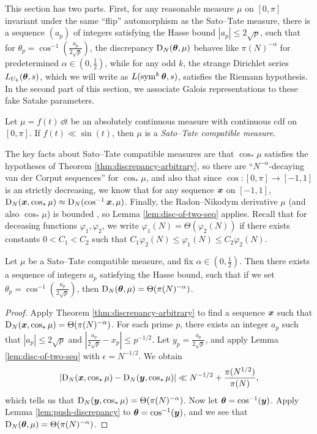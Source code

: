This section has two parts. First, for any reasonable measure $\mu$ on 
$[0,\pi]$ invariant under the same ``flip'' automorphism as the Sato--Tate 
measure, there is a sequence $(a_p)$ of integers satisfying the Hasse 
bound $|a_p|\leqslant 2\sqrt p$, such that for 
$\theta_p = \cos^{-1}\left(\frac{a_p}{2\sqrt p}\right)$, the discrepancy 
$\operatorname{D}_N({\boldsymbol\theta},\mu)$ behaves like $\pi(N)^{-\alpha}$ for predetermined 
$\alpha\in \left(0,\frac 1 2\right)$, while for any odd $k$, the strange 
Dirichlet series $L_{U_k}({\boldsymbol\theta},s)$, which we will write as 
$L(\operatorname{sym}^k {\boldsymbol\theta},s)$, satisfies the Riemann hypothesis. In the second part of 
this section, we associate Galois representations to these fake Satake 
parameters. 

\begin{definition}
Let $\mu = f(t)\, \dd t$ be an absolutely continuous measure with continuous 
cdf on $[0,\pi]$. If $f(t) \ll \sin(t)$, then $\mu$ is a \emph{Sato--Tate compatible measure}. 
\end{definition}

The key facts about Sato--Tate compatible measures are that $\cos_\ast\mu$ 
satisfies the hypotheses of Theorem \ref{thm:discrepancy-arbitrary}, so 
there are ``$N^{-\alpha}$-decaying van der Corput sequences'' for 
$\cos_\ast\mu$, and also that since $\cos\colon [0,\pi] \to [-1,1]$ is an 
strictly decreasing, we know that for any sequence ${\boldsymbol x}$ on $[-1,1]$, 
$\operatorname{D}_N({\boldsymbol x},\cos_\ast\mu) \approx \operatorname{D}_N(\cos^{-1}{\boldsymbol x},\mu)$. Finally, the 
Radon--Nikodym derivative $\mu$ (and also $\cos_\ast\mu$) is bounded , so Lemma 
\ref{lem:disc-of-two-seq} applies. Recall that for deceasing functions 
$\varphi_1,\varphi_2$, we write $\varphi_1(N) = \Theta(\varphi_2(N))$ if 
there exists constants $0 < C_1 < C_2$ such that 
$C_1 \varphi_2(N) \leqslant \varphi_1(N) \leqslant C_2 \varphi_2(N)$. 


\begin{theorem}\label{thm:integral-a_p-alpha}
Let $\mu$ be a Sato--Tate compatible measure, and fix 
$\alpha\in \left(0,\frac 1 2\right)$. 
Then there exists a sequence of integers $a_p$ satisfying the Hasse bound, 
such that if we set $\theta_p = \cos^{-1}\left(\frac{a_p}{2\sqrt p}\right)$, 
then $\operatorname{D}_N({\boldsymbol\theta},\mu) = \Theta(\pi(N)^{-\alpha})$. 
\end{theorem}
\begin{proof}
Apply Theorem \ref{thm:discrepancy-arbitrary} to find a sequence ${\boldsymbol x}$ such 
that $\operatorname{D}_N({\boldsymbol x},\cos_\ast \mu) = \Theta(\pi(N)^{-\alpha})$. For each prime 
$p$, there exists an integer $a_p$ such that $|a_p|\leqslant 2\sqrt p$ and 
$\left| \frac{a_p}{2\sqrt p} - x_p\right| \leqslant p^{-1/2}$. Let 
$y_p = \frac{a_p}{2\sqrt p}$, and apply Lemma \ref{lem:disc-of-two-seq} with 
$\epsilon = N^{-1/2}$. We obtain 
\[
	\left| \operatorname{D}_N({\boldsymbol x},\cos_\ast \mu) - \operatorname{D}_N({\boldsymbol y}, \cos_\ast \mu)\right| \ll  N^{-1/2} + \frac{\pi(N^{1/2})}{\pi(N)} ,
\]
which tells us that $\operatorname{D}_N({\boldsymbol y},\cos_\ast\mu) = \Theta(\pi(N)^{-\alpha})$. 
Now let ${\boldsymbol\theta} = \cos^{-1}({\boldsymbol y})$. Apply Lemma \ref{lem:push-discrepancy} to 
${\boldsymbol\theta} = \cos^{-1}({\boldsymbol y})$, and we see that 
$\operatorname{D}_N({\boldsymbol\theta},\mu) = \Theta(\pi(N)^{-\alpha})$. 
\end{proof}

